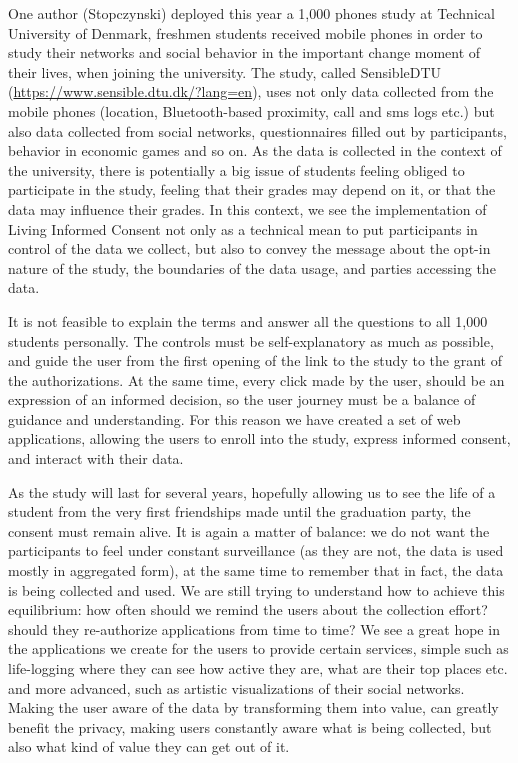 One author (Stopczynski) deployed this year a 1,000 phones study at Technical University of Denmark, freshmen students received mobile phones in order to study their networks and social behavior in the important change moment of their lives, when joining the university.
The study, called SensibleDTU (\url{https://www.sensible.dtu.dk/?lang=en}), uses not only data collected from the mobile phones (location, Bluetooth-based proximity, call and sms logs etc.) but also data collected from social networks, questionnaires filled out by participants, behavior in economic games and so on.
As the data is collected in the context of the university, there is potentially a big issue of students feeling obliged to participate in the study, feeling that their grades may depend on it, or that the data may influence their grades.
In this context, we see the implementation of Living Informed Consent not only as a technical mean to put participants in control of the data we collect, but also to convey the message about the opt-in nature of the study, the boundaries of the data usage, and parties accessing the data.

It is not feasible to explain the terms and answer all the questions to all 1,000 students personally.
The controls must be self-explanatory as much as possible, and guide the user from the first opening of the link to the study to the grant of the authorizations.
At the same time, every click made by the user, should be an expression of an informed decision, so the user journey must be a balance of guidance and understanding.
For this reason we have created a set of web applications, allowing the users to enroll into the study, express informed consent, and interact with their data.

As the study will last for several years, hopefully allowing us to see the life of a student from the very first friendships made until the graduation party, the consent must remain alive.
It is again a matter of balance: we do not want the participants to feel under constant surveillance (as they are not, the data is used mostly in aggregated form), at the same time to remember that in fact, the data is being collected and used.
We are still trying to understand how to achieve this equilibrium: how often should we remind the users about the collection effort? should they re-authorize applications from time to time?
We see a great hope in the applications we create for the users to provide certain services, simple such as life-logging where they can see how active they are, what are their top places etc. and more advanced, such as artistic visualizations of their social networks.
Making the user aware of the data by transforming them into value, can greatly benefit the privacy, making users constantly aware what is being collected, but also what kind of value they can get out of it.

